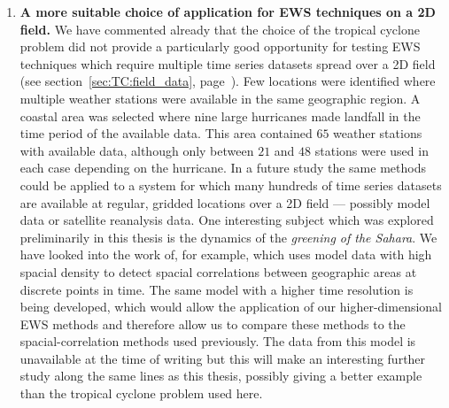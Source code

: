 \begin{enumerate}
	\item {\bf A more suitable choice of application for EWS techniques on a 2D field.} We have commented already that the choice of the tropical cyclone problem did not provide a particularly good opportunity for testing EWS techniques which require multiple time series datasets spread over a 2D field (see section~\ref{sec:TC:field_data}, page~\pageref{sec:TC:field_data}). Few locations were identified where multiple weather stations were available in the same geographic region. A coastal area was selected where nine large  hurricanes made landfall in the time period of the available data. This area contained $65$ weather stations with available data, although  only between $21$ and $48$ stations were used in each case depending on the hurricane. In a future study the same methods could be applied to a system for which many hundreds of time series datasets are available at regular, gridded locations over a 2D field — possibly model data or satellite reanalysis data. One interesting subject which was explored preliminarily in this thesis is the dynamics of the \emph{greening of the Sahara}. We have looked into the work of, for example, \cite{bathiany2013p1} which uses model data with high spacial density to detect spacial correlations between geographic areas at discrete points in time. The same model with a higher time resolution is being developed, which would allow the application of our higher-dimensional EWS methods and therefore allow us to compare these methods to the spacial-correlation methods used previously. The data from this model is unavailable at the time of writing but this will make an interesting further study along the same lines as this thesis, possibly giving a better example than the tropical cyclone problem used here. 
\end{enumerate}




